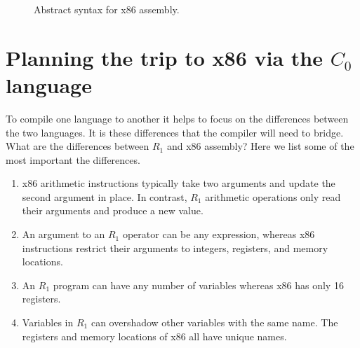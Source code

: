 \documentclass[11pt]{book}
\begin{document}
\begin{figure}[tp]
\caption{Abstract syntax for x86 assembly.}
\label{fig:x86-ast-a}
\end{figure}

\section{Planning the trip to x86 via the $C_0$ language}
\label{sec:plan-s0-x86}

To compile one language to another it helps to focus on the
differences between the two languages. It is these differences that
the compiler will need to bridge. What are the differences between
$R_1$ and x86 assembly? Here we list some of the most important the
differences.

\begin{enumerate}
\item x86 arithmetic instructions typically take two arguments and
  update the second argument in place. In contrast, $R_1$ arithmetic
  operations only read their arguments and produce a new value.

\item An argument to an $R_1$ operator can be any expression, whereas
  x86 instructions restrict their arguments to integers, registers,
  and memory locations.

\item An $R_1$ program can have any number of variables whereas x86
  has only 16 registers.

\item Variables in $R_1$ can overshadow other variables with the same
  name. The registers and memory locations of x86 all have unique
  names.
\end{enumerate}
\end{document}
